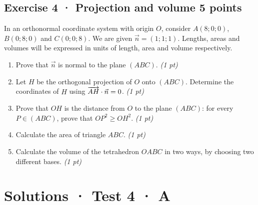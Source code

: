 \subsection*{Exercise 4 · Projection and volume \hfill 5 points}In an orthonormal coordinate system with origin $O$, consider $A(8;0;0)$, $B(0;8;0)$ and $C(0;0;8)$. We are given $\vec n=(1;1;1)$. Lengths, areas and volumes will be expressed in units of length, area and volume respectively.

\begin{enumerate}

\item Prove that $\vec n$ is normal to the plane $(ABC)$. \hfill\textit{(1 pt)}

\item Let $H$ be the orthogonal projection of $O$ onto $(ABC)$. Determine the coordinates of $H$ using $\overrightarrow{AH}\cdot\vec n=0$. \hfill\textit{(1 pt)}

\item Prove that $OH$ is the distance from $O$ to the plane $(ABC)$: for every $P\in(ABC)$, prove that $OP^2\ge OH^2$. \hfill\textit{(1 pt)}

\item Calculate the area of triangle $ABC$. \hfill\textit{(1 pt)}

\item Calculate the volume of the tetrahedron $OABC$ in two ways, by choosing two different bases. \hfill\textit{(1 pt)}

\end{enumerate}

\ifprof\clearpage

\section*{Solutions · Test 4 · A}\label{cor:6-3}

